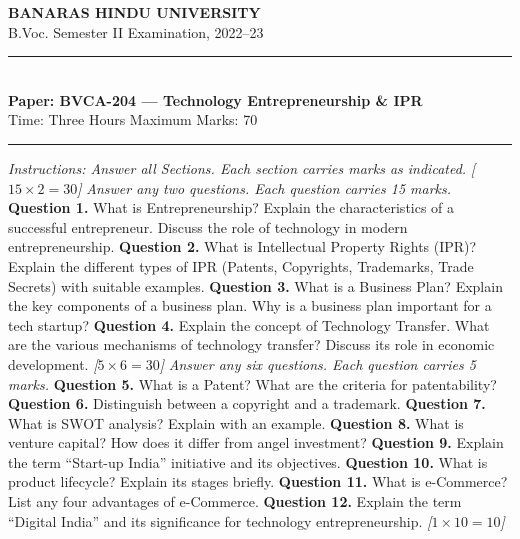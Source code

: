 \documentclass[11pt,a4paper]{article}
\newcommand{\pts}[1]{\hfill\textit{[#1]}}
\begin{document}
\begin{center}
  {\large\bfseries BANARAS HINDU UNIVERSITY}\\[2pt]
  {\normalsize B.Voc. Semester II Examination, 2022--23}\\[6pt]
  \rule{0.8\linewidth}{0.5pt}\\[6pt]
  {\large\bfseries Paper: BVCA-204 --- Technology Entrepreneurship \& IPR}\\[4pt]
  {\normalsize Time: Three Hours \hfill Maximum Marks: 70}
\end{center}
\rule{\linewidth}{0.4pt}
\smallskip
\noindent\textit{Instructions: Answer all Sections. Each section carries marks as indicated.}
\bigskip
{}\pts{$15\times2=30$}
\medskip\noindent\textit{Answer any two questions. Each question carries 15 marks.}
\bigskip
\noindent\textbf{Question 1.} What is Entrepreneurship? Explain the characteristics of a successful entrepreneur. Discuss the role of technology in modern entrepreneurship.
\bigskip
\noindent\textbf{Question 2.} What is Intellectual Property Rights (IPR)? Explain the different types of IPR (Patents, Copyrights, Trademarks, Trade Secrets) with suitable examples.
\bigskip
\noindent\textbf{Question 3.} What is a Business Plan? Explain the key components of a business plan. Why is a business plan important for a tech startup?
\bigskip
\noindent\textbf{Question 4.} Explain the concept of Technology Transfer. What are the various mechanisms of technology transfer? Discuss its role in economic development.
\bigskip
{}\pts{$5\times6=30$}
\medskip\noindent\textit{Answer any six questions. Each question carries 5 marks.}
\bigskip
\noindent\textbf{Question 5.} What is a Patent? What are the criteria for patentability?
\medskip\noindent\textbf{Question 6.} Distinguish between a copyright and a trademark.
\medskip\noindent\textbf{Question 7.} What is SWOT analysis? Explain with an example.
\medskip\noindent\textbf{Question 8.} What is venture capital? How does it differ from angel investment?
\medskip\noindent\textbf{Question 9.} Explain the term ``Start-up India'' initiative and its objectives.
\medskip\noindent\textbf{Question 10.} What is product lifecycle? Explain its stages briefly.
\medskip\noindent\textbf{Question 11.} What is e-Commerce? List any four advantages of e-Commerce.
\medskip\noindent\textbf{Question 12.} Explain the term ``Digital India'' and its significance for technology entrepreneurship.
\bigskip
{}\pts{$1\times10=10$}
\end{document}
